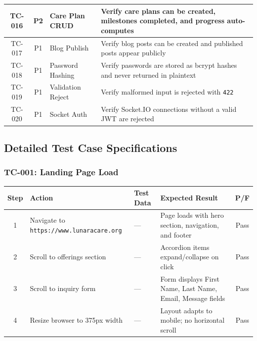 \documentclass[12pt,letterpaper]{article}
\begin{document}
{\begin{longtable}{|c|c|>{\raggedright\arraybackslash}p{3cm}|>{\raggedright\arraybackslash}p{6.5cm}|}
TC-016 & P2 & Care Plan CRUD & Verify care plans can be created, milestones completed, and progress auto-computes \\
\hline
TC-017 & P1 & Blog Publish & Verify blog posts can be created and published posts appear publicly \\
\hline
\rowcolor{TableRowAlt}
TC-018 & P1 & Password Hashing & Verify passwords are stored as bcrypt hashes and never returned in plaintext \\
\hline
TC-019 & P1 & Validation Reject & Verify malformed input is rejected with \texttt{422} \\
\hline
\rowcolor{TableRowAlt}
TC-020 & P1 & Socket Auth & Verify Socket.IO connections without a valid JWT are rejected \\
\hline
\end{longtable}
}

\newpage

\subsection{Detailed Test Case Specifications}

\subsubsection*{TC-001: Landing Page Load}

\begin{table}[H]
\centering
\small
\begin{tabularx}{\textwidth}{|c|>{\raggedright\arraybackslash}X|>{\raggedright\arraybackslash}p{2cm}|>{\raggedright\arraybackslash}X|c|}
\hline
\rowcolor{TableHeader}\textcolor{TableHeaderText}{\textbf{Step}} & \textcolor{TableHeaderText}{\textbf{Action}} & \textcolor{TableHeaderText}{\textbf{Test Data}} & \textcolor{TableHeaderText}{\textbf{Expected Result}} & \textcolor{TableHeaderText}{\textbf{P/F}} \\
\hline
1 & Navigate to \texttt{https://www.lunaracare.org} & --- & Page loads with hero section, navigation, and footer & Pass \\
\hline
\rowcolor{TableRowAlt}
2 & Scroll to offerings section & --- & Accordion items expand/collapse on click & Pass \\
\hline
3 & Scroll to inquiry form & --- & Form displays First Name, Last Name, Email, Message fields & Pass \\
\hline
\rowcolor{TableRowAlt}
4 & Resize browser to 375px width & --- & Layout adapts to mobile; no horizontal scroll & Pass \\
\hline
\end{tabularx}
\end{table}
\end{document}
